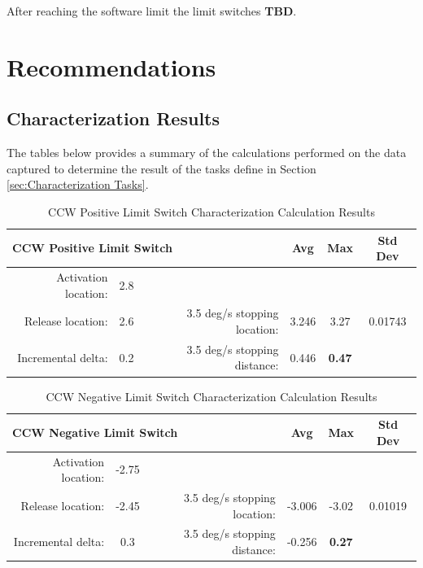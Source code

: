 \documentclass[SE,authoryear,toc, lsstdraft]{lsstdoc}
\begin{document}
After reaching the software limit the limit switches \textbf{TBD}.

\section{Recommendations}

\subsection{Characterization Results}

The tables below provides a summary of the calculations performed on the
data captured to determine the result of the tasks define in Section \ref{sec:Characterization Tasks}.

\begin{table}[h!]
  \begin{center}
    \caption{CCW Positive Limit Switch Characterization Calculation Results}
    \label{tab:table1}
    \begin{tabular}{r|c|r|c|c|c}
    \multicolumn{3}{l|}{\textbf{CCW Positive Limit Switch}} & Avg & Max & Std Dev\\
    \midrule
    Activation location: & 2.8 & & & & \\
    Release location: & 2.6 & 3.5 deg/s stopping location: & 3.246 & 3.27 & 0.01743 \\
    Incremental delta: & 0.2 & 3.5 deg/s stopping distance: & 0.446 & \textbf{0.47} & \\
    \end{tabular}
  \end{center}
\end{table}

\begin{table}[h!]
  \begin{center}
    \caption{CCW Negative Limit Switch Characterization Calculation Results}
    \label{tab:table2}
    \begin{tabular}{r|c|r|c|c|c}
    \multicolumn{3}{l|}{\textbf{CCW Negative Limit Switch}} & Avg & Max & Std Dev\\
    \midrule
    Activation location: & -2.75 & & & & \\
    Release location: & -2.45 & 3.5 deg/s stopping location: & -3.006 & -3.02 & 0.01019 \\
    Incremental delta: & 0.3 & 3.5 deg/s stopping distance: & -0.256 & \textbf{0.27} & \\
    \end{tabular}
  \end{center}
\end{table}
\end{document}
